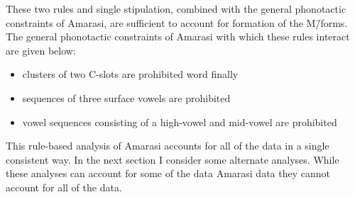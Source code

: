 These two rules and single stipulation,
combined with the general phonotactic constraints of Amarasi,
are sufficient to account for formation of the M\=/forms.
The general phonotactic constraints of Amarasi with which these rules
interact are given below:

\begin{itemize}
	\item clusters of two C-slots are prohibited word finally
	\item sequences of three surface vowels are prohibited
	\item vowel sequences consisting of a high-vowel and mid-vowel are prohibited
\end{itemize}

This rule-based analysis of Amarasi accounts for
all of the data in a single consistent way.
In the next section I consider some alternate analyses.
While these analyses can account for some of the data Amarasi data
they cannot account for all of the data.
